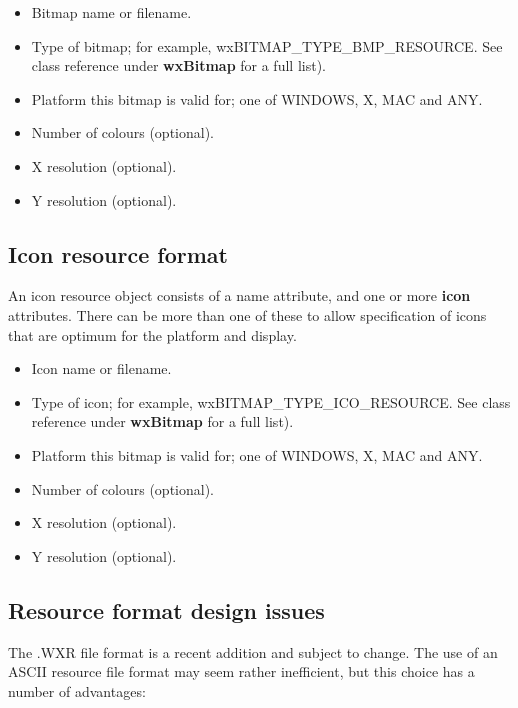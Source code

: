 \begin{itemize}\itemsep=0pt
\item Bitmap name or filename.
\item Type of bitmap; for example, wxBITMAP\_TYPE\_BMP\_RESOURCE. See class reference under {\bf wxBitmap} for
a full list).
\item Platform this bitmap is valid for; one of WINDOWS, X, MAC and ANY.
\item Number of colours (optional).
\item X resolution (optional).
\item Y resolution (optional).
\end{itemize}

\subsection{Icon resource format}

An icon resource object consists of a name attribute, and one or more {\bf icon} attributes.
There can be more than one of these to allow specification of icons that are optimum for the
platform and display.

\begin{itemize}\itemsep=0pt
\item Icon name or filename.
\item Type of icon; for example, wxBITMAP\_TYPE\_ICO\_RESOURCE. See class reference under {\bf wxBitmap} for
a full list).
\item Platform this bitmap is valid for; one of WINDOWS, X, MAC and ANY.
\item Number of colours (optional).
\item X resolution (optional).
\item Y resolution (optional).
\end{itemize}

\subsection{Resource format design issues}

The .WXR file format is a recent addition and subject to change.
The use of an ASCII resource file format may seem rather inefficient, but this
choice has a number of advantages:

